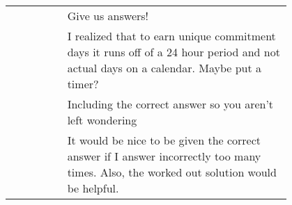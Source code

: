 {\begin{longtable}{R|p{0.8\linewidth}}
		& Give us answers!                                                                                                                                                                                                                                                                                                                                                                                                                                                                                                                                                                                                                                                                                                                                 \\
		& I realized that to earn unique commitment days it runs off of a 24 hour period and not actual days on a calendar. Maybe put a timer?                                                                                                                                                                                                                                                                                                                                                                                                                                                                                                                                                                                                             \\
		& Including the correct answer so you aren't left wondering                                                                                                                                                                                                                                                                                                                                                                                                                                                                                                                                                                                                                                                                                        \\
		& It would be nice to be given the correct answer if I answer incorrectly too many times. Also, the worked out solution would be helpful.                                                                                                                                                                                                                                                                                                                                                                                                                                                                                                                                                                                                          \\

\end{longtable}}
